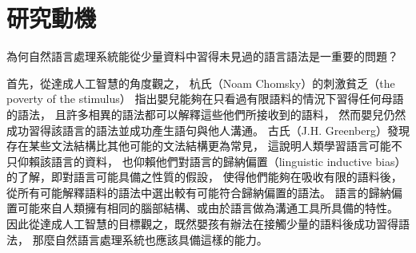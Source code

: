 \section{研究動機}

\iffalse
讓電腦理解人類語言，是幾乎所有從事人工智慧的研究者們最終的目標。
近年來，巨量資料與硬體資源的進步大幅推動了自然語言處理的發展。
1957年佛氏 （John Rupert Firth）\cite{Firth1957ASO}所提倡的分布假說（distributional hypothesis）：
``You shall know a word by the company it keeps''.
為基於分佈語義學（distributional semantics）的方法提供了理論基礎；
2014年米氏（Tomas Mikolov）提出的文字向量（word2vec）\cite{Mikolov2013DistributedRO}
到2018年彼氏\cite{peters-etal-2018-deep}與戴氏\cite{devlin-etal-2019-bert}先後提出的上下文化詞向量（contextualized word representations），
其訓練所使用的語料愈來愈龐雜，模型參數愈大，
於下游任務（downstream task）如詞性標注（part-of-speech tagging）、句法剖析（syntactic parsing）、語意角色標注（semantic role labeling）、問答系統（question answering）等的表現愈佳。

而巨量資料需要大模型的表現力（expressiveness）來加以建模，才有用武之地；
大模型的巨量參數則需要巨量資料才不致過擬合（overfitting）；兩者相輔相成，缺一不可。

但是只有少數常見語言如英文、中文等存在巨量資料供模型訓練，而這些語言僅佔地球上所有語言的5\%；
占比95\%的資料不足語言（low-resource languages）卻無法直接套用需要巨量資料的大參數模型而在下游任務中獲得與常見語言同樣的進步。
幸而語言儘管表面形式（surface form）不一，深層結構卻驚人地相似\cite{greenberg1963universals}，
因此出現許多研究致力於將多語言訓練（multilingual training）在其他資料充足語言（high-resource languages）上的模型轉移（transfer）到資料不足語言，
希望能藉助資料充足語言與資料不足語言的相似性，提高資料不足語言上的任務表現。
\fi

為何自然語言處理系統能從少量資料中習得未見過的語言語法是一重要的問題？

首先，從達成人工智慧的角度觀之，
杭氏（Noam Chomsky）的刺激貧乏（the poverty of the stimulus）\cite{chomsky1980rules}
指出嬰兒能夠在只看過有限語料的情況下習得任何母語的語法，
且許多相異的語法都可以解釋這些他們所接收到的語料，
然而嬰兒仍然成功習得該語言的語法並成功產生語句與他人溝通。
古氏（J.H. Greenberg）發現存在某些文法結構比其他可能的文法結構更為常見，
這說明人類學習語言可能不只仰賴該語言的資料，
也仰賴他們對語言的歸納偏置（linguistic inductive bias）的了解，即對語言可能具備之性質的假設，
使得他們能夠在吸收有限的語料後，從所有可能解釋語料的語法中選出較有可能符合歸納偏置的語法。
語言的歸納偏置可能來自人類擁有相同的腦部結構、或由於語言做為溝通工具所具備的特性\cite{Zipf1949HumanBA}。
因此從達成人工智慧的目標觀之，既然嬰孩有辦法在接觸少量的語料後成功習得語法，
那麼自然語言處理系統也應該具備這樣的能力。


